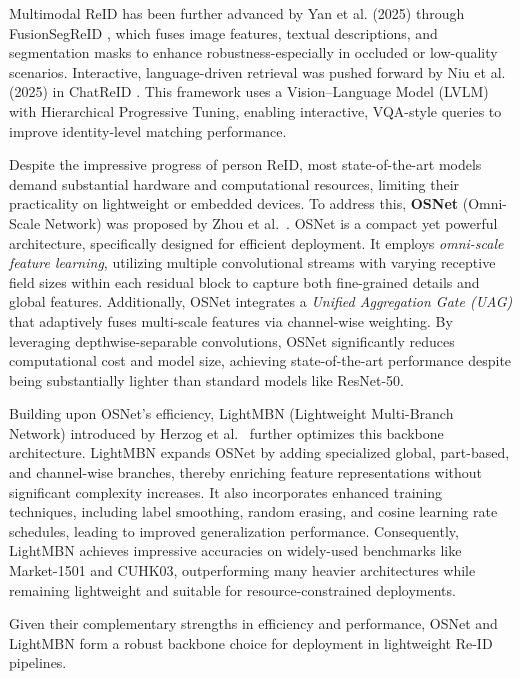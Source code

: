 \documentclass[../main.tex]{subfiles}
\begin{document}
Multimodal ReID has been further advanced by Yan et al. (2025) through \\ FusionSegReID \cite{fusionsegreid}, which fuses image features, textual descriptions, and \\ segmentation masks to enhance robustness-especially in occluded or low-quality scenarios. Interactive, language-driven retrieval was pushed forward by Niu et al. (2025) in ChatReID \cite{chatreid}. This framework uses a Vision–Language Model (LVLM) with Hierarchical Progressive Tuning, enabling interactive, VQA-style queries to improve identity-level matching performance.

Despite the impressive progress of person ReID, most state-of-the-art models demand substantial hardware and computational resources, limiting their practicality on lightweight or embedded devices. To address this, \textbf{OSNet} (Omni-Scale Network) was proposed by Zhou et al.~\cite{zhou2019omniscalefeaturelearningperson}. OSNet is a compact yet powerful architecture, specifically designed for efficient deployment. It employs \textit{omni-scale feature learning}, utilizing multiple convolutional streams with varying receptive field sizes within each residual block to capture both fine-grained details and global features. Additionally, OSNet integrates a \textit{Unified Aggregation Gate (UAG)} that adaptively fuses multi-scale features via channel-wise weighting. By leveraging depthwise-separable convolutions, OSNet significantly reduces computational cost and model size, achieving state-of-the-art performance despite being substantially lighter than standard models like ResNet-50.

Building upon OSNet's efficiency, LightMBN (Lightweight Multi-Branch Network) introduced by Herzog et al.~\cite{Herzog_2021} further optimizes this backbone architecture. LightMBN expands OSNet by adding specialized global, part-based, and channel-wise branches, thereby enriching feature representations without significant complexity increases. It also incorporates enhanced training techniques, including label smoothing, random erasing, and cosine learning rate schedules, leading to improved generalization performance. Consequently, LightMBN achieves impressive accuracies on widely-used benchmarks like Market-1501 and CUHK03, outperforming many heavier architectures while remaining lightweight and suitable for resource-constrained deployments.

Given their complementary strengths in efficiency and performance, OSNet and LightMBN form a robust backbone choice for deployment in lightweight Re-ID pipelines.
\end{document}

